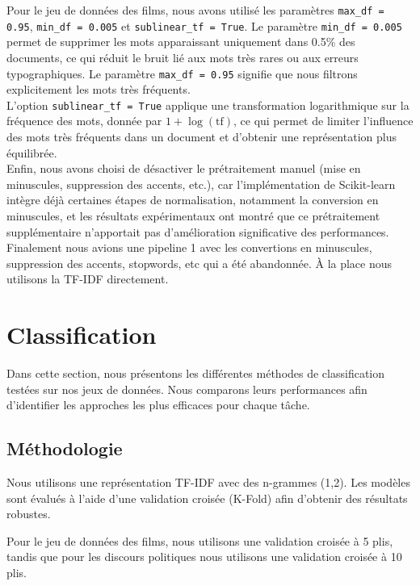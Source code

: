 \documentclass{article}
\begin{document}
Pour le jeu de données des films, nous avons utilisé les paramètres \texttt{max\_df = 0.95}, \texttt{min\_df = 0.005} et \texttt{sublinear\_tf = True}. Le paramètre \texttt{min\_df = 0.005} permet de supprimer les mots apparaissant uniquement dans 0.5\% des documents, ce qui réduit le bruit lié aux mots très rares ou aux erreurs typographiques. Le paramètre \texttt{max\_df = 0.95} signifie que nous filtrons explicitement les mots très fréquents.\\

L'option \texttt{sublinear\_tf = True} applique une transformation logarithmique sur la fréquence des mots, donnée par \(1 + \log(\text{tf})\), ce qui permet de limiter l'influence des mots très fréquents dans un document et d'obtenir une représentation plus équilibrée.\\

Enfin, nous avons choisi de désactiver le prétraitement manuel (mise en minuscules, suppression des accents, etc.), car l'implémentation de Scikit-learn intègre déjà certaines étapes de normalisation, notamment la conversion en minuscules, et les résultats expérimentaux ont montré que ce prétraitement supplémentaire n'apportait pas d'amélioration significative des performances. Finalement nous avions une pipeline 1 avec les convertions en minuscules, suppression des accents, stopwords, etc qui a été abandonnée. À la place nous utilisons la TF-IDF directement.\\



\section{Classification}

Dans cette section, nous présentons les différentes méthodes de classification testées sur nos jeux de données. Nous comparons leurs performances afin d’identifier les approches les plus efficaces pour chaque tâche.




\subsection{Méthodologie}

Nous utilisons une représentation TF-IDF avec des n-grammes (1,2). Les modèles sont évalués à l’aide d’une validation croisée (K-Fold) afin d’obtenir des résultats robustes.

Pour le jeu de données des films, nous utilisons une validation croisée à 5 plis, tandis que pour les discours politiques nous utilisons une validation croisée à 10 plis.
\end{document}
